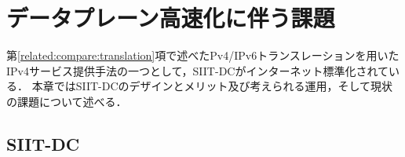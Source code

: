 \chapter{データプレーン高速化に伴う課題}
\label{issue}
第\ref{related:compare:translation}項で述べたPv4/IPv6トランスレーションを用いたIPv4サービス提供手法の一つとして，SIIT-DCがインターネット標準化されている．
本章ではSIIT-DCのデザインとメリット及び考えられる運用，そして現状の課題について述べる．
\section{SIIT-DC}
\label{issue:siit-dc}







